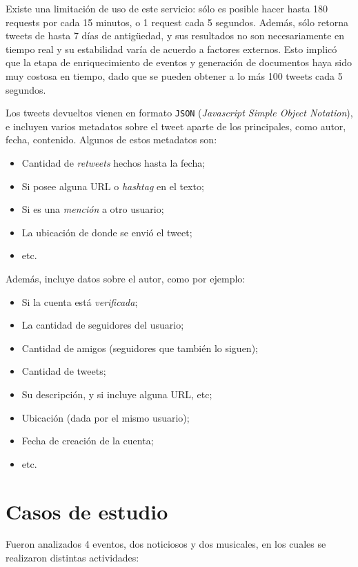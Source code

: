    Existe una limitación de uso de este servicio: sólo es posible hacer
   hasta 180 requests por cada 15 minutos, o 1 request cada 5
   segundos. Además, sólo retorna tweets de hasta 7 días de antigüedad, y
   sus resultados no son necesariamente en tiempo real y su estabilidad
   varía de acuerdo a factores externos. Esto implicó que la etapa de
   enriquecimiento de eventos y generación de documentos haya sido muy
   costosa en tiempo, dado que se pueden obtener a lo más 100 tweets
   cada 5 segundos.

   Los tweets devueltos vienen en formato \texttt{JSON} (\emph{Javascript Simple Object Notation}),
   e incluyen varios metadatos sobre el tweet aparte de los principales,
   como autor, fecha, contenido. Algunos de estos metadatos son:

\begin{itemize}
\item Cantidad de \emph{retweets} hechos hasta la fecha;
\item Si posee alguna URL o \emph{hashtag} en el texto;
\item Si es una \emph{mención} a otro usuario;
\item La ubicación de donde se envió el tweet;
\item etc.
\end{itemize}
  Además, incluye datos sobre el autor, como por ejemplo:

\begin{itemize}
\item Si la cuenta está \emph{verificada};
\item La cantidad de seguidores del usuario;
\item Cantidad de amigos (seguidores que también lo siguen);
\item Cantidad de tweets;
\item Su descripción, y si incluye alguna URL, etc;
\item Ubicación (dada por el mismo usuario);
\item Fecha de creación de la cuenta;
\item etc.
\end{itemize}


\section{Casos de estudio}
\label{sec-4.4}

\label{casosest}

  Fueron analizados 4 eventos, dos noticiosos y dos musicales, en los
  cuales se realizaron distintas actividades:

